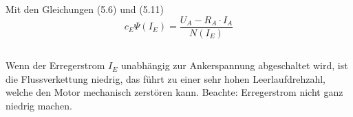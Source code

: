 \chapter{}\label{ex:aufg4}
%
\section{}\label{sec:aufg4a}
Mit den Gleichungen (5.6) und (5.11)
\begin{equation}
c_E\Psi(I_E) = \frac{U_A - R_A \cdot I_A}{N(I_E)}
\end{equation}
\section{}\label{sec:aufg4b}
Wenn der Erregerstrom $I_E$ unabhängig zur Ankerspannung abgeschaltet wird, ist die Flussverkettung niedrig, das führt zu einer sehr hohen Leerlaufdrehzahl, welche den Motor mechanisch zerstören kann.
Beachte: Erregerstrom nicht ganz niedrig machen. 
\section{}\label{sec:aufg4c}
%
\section{}\label{sec:aufg4d}

\clearpage